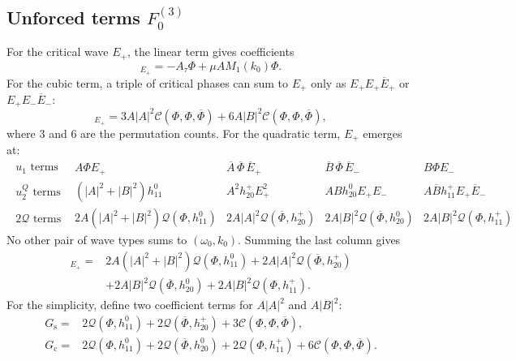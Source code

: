 \documentclass[11pt]{article}
\newcommand{\cQ}{\mathcal{Q}}
\newcommand{\cC}{\mathcal{C}}
\newcommand{\cL}{\mathcal{L}}
\begin{document}
\subsection{Unforced terms $F_{0}^{(3)}$}
For the critical wave $E_+$, the linear term gives coefficients
\begin{equation}
 [-\partial_\tau u_1+\mu\cL_1u_1]_{E_+}
 =-A_\tau\Phi+\mu A M_1(k_0)\Phi.
 \label{eq:unforced-linear-plus}
\end{equation}
For the  cubic term, a triple of critical phases can sum to $E_+$ only as
$E_+E_+\overline E_+$ or $E_+E_-\overline E_-$:
\begin{equation}
 [\cC(u_1,u_1,u_1)]_{E_+}
 =3A|A|^2\cC(\Phi,\Phi,\overline\Phi)
 +6A|B|^2\cC(\Phi,\Phi,\overline\Phi),
 \label{eq:C-resonant}
\end{equation}
where $3$ and $6$ are the permutation counts. For the quadratic term, $E_+$ emerges at:
\begin{equation*}
\begin{array}{c||c|c|c|c}
\begin{array}{c}
u_1\text{ terms}
\end{array}
& A\Phi E_+
& \overline A\,\overline\Phi\,\overline E_+
& \overline B\,\overline\Phi\,\overline E_-
& B\Phi E_-
\\ \hline
\begin{array}{c}
u_2^Q\text{ terms}
\end{array}
& (|A|^2+|B|^2)h_{11}^0
& A^2h_{20}^+E_+^2
& ABh_{20}^0E_+E_-
& A\overline Bh_{11}^+E_+\overline E_-
\\ \hline
\begin{array}{c}
2\cQ\text{ terms}
\end{array}
& 2A(|A|^2+|B|^2)\cQ(\Phi,h_{11}^0)
& 2A|A|^2\cQ(\overline\Phi,h_{20}^+)
& 2A|B|^2\cQ(\overline\Phi,h_{20}^0)
& 2A|B|^2\cQ(\Phi,h_{11}^+)
\end{array}
\label{eq:quadratic-Eplus-selection}
\end{equation*}
No other pair of wave types sums to $(\omega_0,k_0)$.  Summing the last
column gives
\begin{align}
 [2\cQ(u_1,u_2^Q)]_{E_+}=&
 2A(|A|^2+|B|^2)\cQ(\Phi,h_{11}^0)
 +2A|A|^2\cQ(\overline\Phi,h_{20}^+)\\
 &+2A|B|^2\cQ(\overline\Phi,h_{20}^0)
 +2A|B|^2\cQ(\Phi,h_{11}^+).
 \label{eq:Q-feedback}
\end{align}
For the simplicity, define two coefficient terms for $A|A|^2$ and $A|B|^2$:
\begin{subequations}
\label{eq:G-vectors}
\begin{align}
 G_{\mathrm{s}}={}&2\cQ(\Phi,h_{11}^0)
 +2\cQ(\overline\Phi,h_{20}^+)
 +3\cC(\Phi,\Phi,\overline\Phi),
 \label{eq:Gs}\\
 G_{\mathrm{c}}={}&2\cQ(\Phi,h_{11}^0)
 +2\cQ(\overline\Phi,h_{20}^0)
 +2\cQ(\Phi,h_{11}^+)
 +6\cC(\Phi,\Phi,\overline\Phi).
 \label{eq:Gc}
\end{align}
\end{subequations}
\end{document}
